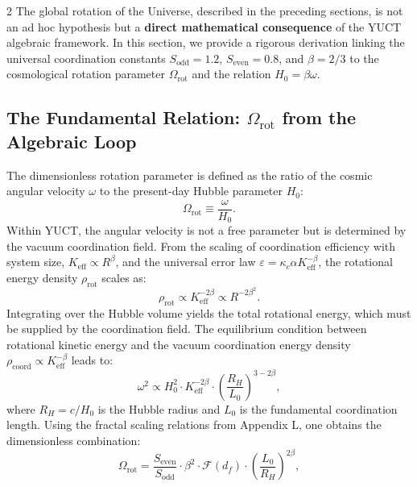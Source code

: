 \documentclass[12pt,a4paper]{article}
\begin{document}
\begin{multicols}{2}
		The global rotation of the Universe, described in the preceding sections, is not an ad hoc hypothesis but a \textbf{direct mathematical consequence} of the YUCT algebraic framework. In this section, we provide a rigorous derivation linking the universal coordination constants \(S_{\mathrm{odd}}=1.2\), \(S_{\mathrm{even}}=0.8\), and \(\beta = 2/3\) to the cosmological rotation parameter \(\Omega_{\mathrm{rot}}\) and the relation \(H_0 = \beta\omega\).
		
		\subsection{The Fundamental Relation: \(\Omega_{\mathrm{rot}}\) from the Algebraic Loop}
		
		The dimensionless rotation parameter is defined as the ratio of the cosmic angular velocity \(\omega\) to the present-day Hubble parameter \(H_0\):
		\begin{equation}
			\Omega_{\mathrm{rot}} \equiv \frac{\omega}{H_0}.
		\end{equation}
		Within YUCT, the angular velocity is not a free parameter but is determined by the vacuum coordination field. From the scaling of coordination efficiency with system size, \(K_{\mathrm{eff}} \propto R^{\beta}\), and the universal error law \(\varepsilon = \kappa_c \alpha K_{\mathrm{eff}}^{-\beta}\), the rotational energy density \(\rho_{\mathrm{rot}}\) scales as:
		\begin{equation}
			\rho_{\mathrm{rot}} \propto K_{\mathrm{eff}}^{-2\beta} \propto R^{-2\beta^2}.
		\end{equation}
		Integrating over the Hubble volume yields the total rotational energy, which must be supplied by the coordination field. The equilibrium condition between rotational kinetic energy and the vacuum coordination energy density \(\rho_{\mathrm{coord}} \propto K_{\mathrm{eff}}^{-\beta}\) leads to:
		\begin{equation}
			\omega^2 \propto H_0^2 \cdot K_{\mathrm{eff}}^{-2\beta} \cdot \left(\frac{R_H}{L_0}\right)^{3-2\beta},
		\end{equation}
		where \(R_H = c/H_0\) is the Hubble radius and \(L_0\) is the fundamental coordination length. Using the fractal scaling relations from Appendix L, one obtains the dimensionless combination:
		\begin{equation}
			\Omega_{\mathrm{rot}} = \frac{S_{\mathrm{even}}}{S_{\mathrm{odd}}} \cdot \beta^2 \cdot \mathcal{F}(d_f) \cdot \left(\frac{L_0}{R_H}\right)^{2\beta},
		\end{equation}

\end{multicols}
\end{document}
